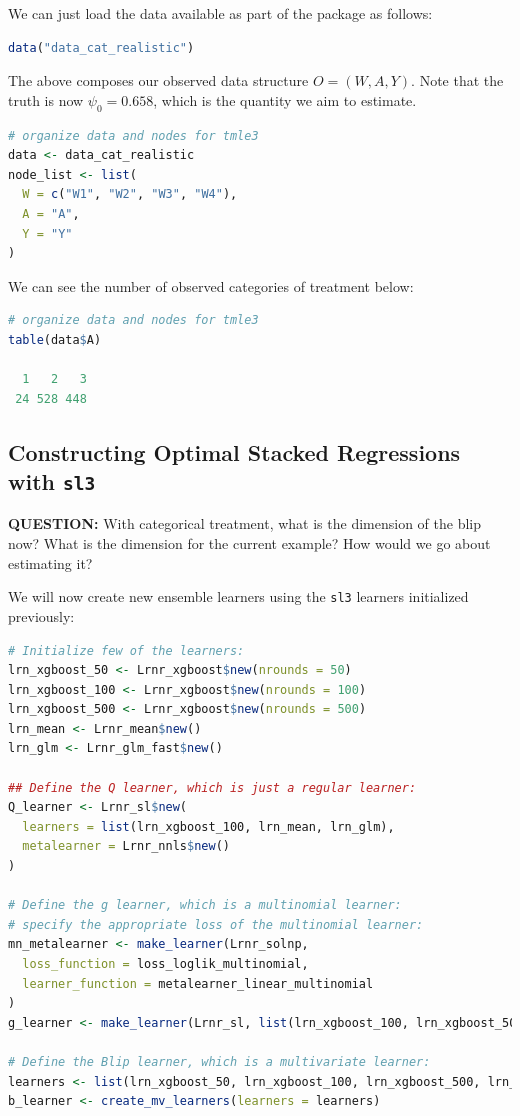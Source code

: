 \documentclass[
  12pt, krantz2,
]{krantz}
\newcommand{\passthrough}[1]{#1}
\newcommand{\1}{\mathbbm{1}}
\theoremstyle{definition}
\theoremstyle{definition}
\theoremstyle{definition}
\theoremstyle{definition}
\theoremstyle{remark}
\begin{document}
We can just load the data available as part of the package as follows:

\begin{lstlisting}[language=R]
data("data_cat_realistic")
\end{lstlisting}

The above composes our observed data structure \(O = (W, A, Y)\). Note that the
truth is now \(\psi_0=0.658\), which is the quantity we aim to estimate.

\begin{lstlisting}[language=R]
# organize data and nodes for tmle3
data <- data_cat_realistic
node_list <- list(
  W = c("W1", "W2", "W3", "W4"),
  A = "A",
  Y = "Y"
)
\end{lstlisting}

We can see the number of observed categories of treatment below:

\begin{lstlisting}[language=R]
# organize data and nodes for tmle3
table(data$A)

  1   2   3 
 24 528 448 
\end{lstlisting}

\hypertarget{constructing-optimal-stacked-regressions-with-sl3-1}{%
\subsection{\texorpdfstring{Constructing Optimal Stacked Regressions with \texttt{sl3}}{Constructing Optimal Stacked Regressions with sl3}}\label{constructing-optimal-stacked-regressions-with-sl3-1}}

\textbf{QUESTION:} With categorical treatment, what is the dimension of the blip now?
What is the dimension for the current example? How would we go about estimating it?

We will now create new ensemble learners using the
\passthrough{\lstinline!sl3!} learners initialized previously:

\begin{lstlisting}[language=R]
# Initialize few of the learners:
lrn_xgboost_50 <- Lrnr_xgboost$new(nrounds = 50)
lrn_xgboost_100 <- Lrnr_xgboost$new(nrounds = 100)
lrn_xgboost_500 <- Lrnr_xgboost$new(nrounds = 500)
lrn_mean <- Lrnr_mean$new()
lrn_glm <- Lrnr_glm_fast$new()

## Define the Q learner, which is just a regular learner:
Q_learner <- Lrnr_sl$new(
  learners = list(lrn_xgboost_100, lrn_mean, lrn_glm),
  metalearner = Lrnr_nnls$new()
)

# Define the g learner, which is a multinomial learner:
# specify the appropriate loss of the multinomial learner:
mn_metalearner <- make_learner(Lrnr_solnp,
  loss_function = loss_loglik_multinomial,
  learner_function = metalearner_linear_multinomial
)
g_learner <- make_learner(Lrnr_sl, list(lrn_xgboost_100, lrn_xgboost_500, lrn_mean), mn_metalearner)

# Define the Blip learner, which is a multivariate learner:
learners <- list(lrn_xgboost_50, lrn_xgboost_100, lrn_xgboost_500, lrn_mean, lrn_glm)
b_learner <- create_mv_learners(learners = learners)
\end{lstlisting}
\end{document}
